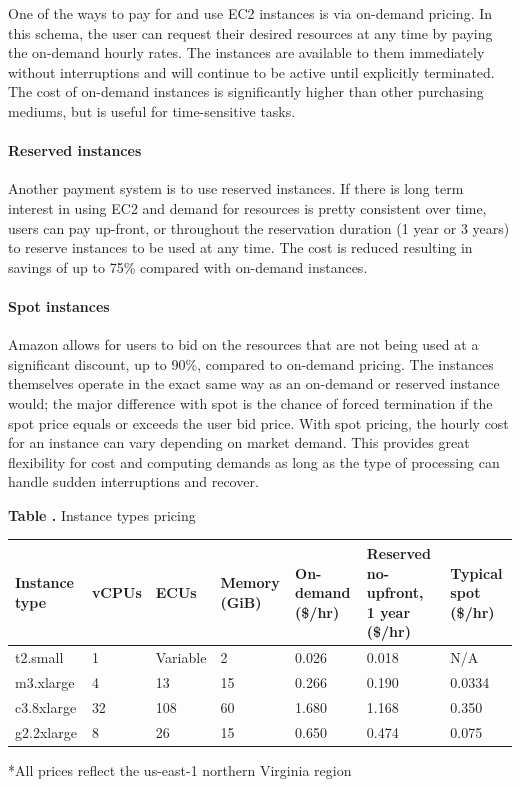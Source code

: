 \documentclass{frontiersSCNS} %
\begin{document}
One of the ways to pay for and use EC2 instances is via on-demand pricing. In this schema, the user can request their desired resources at any time by paying the on-demand hourly rates. The instances are available to them immediately without interruptions and will continue to be active until explicitly terminated. The cost of on-demand instances is significantly higher than other purchasing mediums, but is useful for time-sensitive tasks.

\paragraph{Reserved instances}

Another payment system is to use reserved instances. If there is long term interest in using EC2 and demand for resources is pretty consistent over time, users can pay up-front, or throughout the reservation duration (1 year or 3 years) to reserve instances to be used at any time. The cost is reduced resulting in savings of up to 75\% compared with on-demand instances.

\paragraph{Spot instances}

Amazon allows for users to bid on the resources that are not being used at a significant discount, up to 90\%, compared to on-demand pricing. The instances themselves operate in the exact same way as an on-demand or reserved instance would; the major difference with spot is the chance of forced termination if the spot price equals or exceeds the user bid price. With spot pricing, the hourly cost for an instance can vary depending on market demand. This provides great flexibility for cost and computing demands as long as the type of processing can handle sudden interruptions and recover.

\begin{table}[!t]
\textbf{\label{Tab:01} Table .}{ Instance types pricing}

\processtable{}
{\begin{tabular}{lllllll}\toprule
    Instance type & vCPUs & ECUs & Memory (GiB) & On-demand (\$/hr) & Reserved no-upfront, 1 year (\$/hr) & Typical spot (\$/hr)\\\midrule
    t2.small & 1 & Variable & 2 & 0.026 & 0.018 & N/A\\
    m3.xlarge & 4 & 13 & 15 & 0.266 & 0.190 & 0.0334\\
    c3.8xlarge & 32 & 108 & 60 & 1.680 & 1.168 & 0.350\\
    g2.2xlarge & 8 & 26 & 15 & 0.650 & 0.474 & 0.075
\end{tabular}}{*All prices reflect the us-east-1 northern Virginia region}
\end{table}
\end{document}
